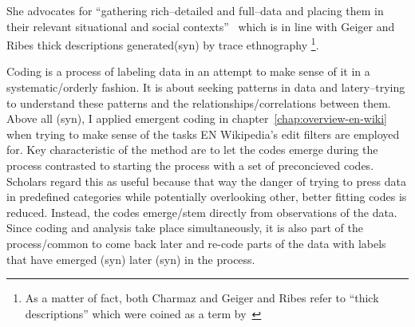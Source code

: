 She advocates for ``gathering rich–detailed and full–data and placing them in their relevant situational and social contexts''~\cite[p.10-11]{Charmaz2006} which is in line with Geiger and Ribes thick descriptions generated(syn) by trace ethnography
\footnote{As a matter of fact, both Charmaz and Geiger and Ribes refer to ``thick descriptions'' which were coined as a term by~\cite{Geertz1973}}.

Coding is a process of labeling data in an attempt to make sense of it in a systematic/orderly fashion.
It is about seeking patterns in data and latery–trying to understand these patterns and the relationships/correlations between them.
Above all (syn), I applied emergent coding in chapter~\ref{chap:overview-en-wiki} when trying to make sense of the tasks EN Wikipedia's edit filters are employed for.
Key characteristic of the method are to let the codes emerge during the process contrasted to starting the process with a set of preconcieved codes.
Scholars regard this as useful because that way the danger of trying to press data in predefined categories while potentially overlooking other, better fitting codes is reduced.
Instead, the codes emerge/stem directly from observations of the data.
Since coding and analysis take place simultaneously, it is also part of the process/common to come back later and re-code parts of the data with labels that have emerged (syn) later (syn) in the process.

